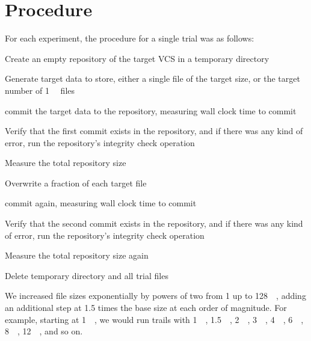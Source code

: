 \section{Procedure}

For each experiment, the procedure for a single trial was as follows:

\begin{tight_enumerate}

    \item Create an empty repository of the target VCS in a temporary directory

    \item Generate target data to store, either a single file of the target
        size, or the target number of \SI{1}{\kibi\byte} files

    \item \Gls{commit} the target data to the repository, measuring wall clock
        time to \gls{commit}

    \item Verify that the first \gls{commit} exists in the repository, and if
        there was any kind of error, run the repository's integrity check
        operation

    \item Measure the total repository size

    \item Overwrite a fraction of each target file

    \item \Gls{commit} again, measuring wall clock time to \gls{commit}

    \item Verify that the second \gls{commit} exists in the repository, and if
        there was any kind of error, run the repository's integrity check
        operation

    \item Measure the total repository size again

    \item Delete temporary directory and all trial files

\end{tight_enumerate}

We increased file sizes exponentially by powers of two from \SI{1}{\byte} up to
\SI{128}{\gibi\byte}, adding an additional step at \num{1.5} times the base size
at each order of magnitude. For example, starting at \SI{1}{\mebi\byte}, we
would run trails with \SI{1}{\mebi\byte}, \SI{1.5}{\mebi\byte},
\SI{2}{\mebi\byte}, \SI{3}{\mebi\byte}, \SI{4}{\mebi\byte}, \SI{6}{\mebi\byte},
\SI{8}{\mebi\byte}, \SI{12}{\mebi\byte}, and so on.

